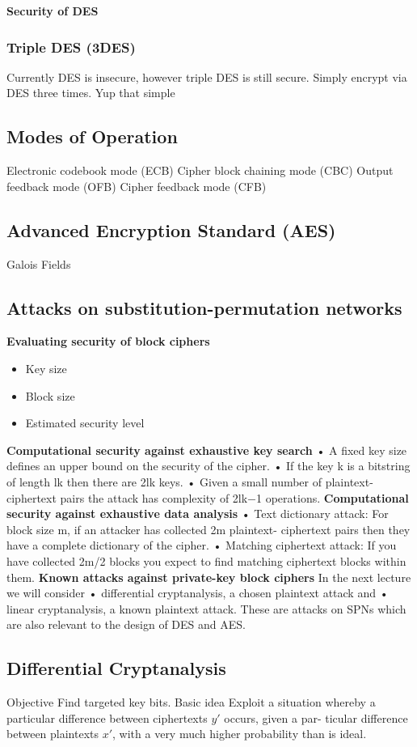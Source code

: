 \textbf{Security of DES}

\subsubsection{Triple DES (3DES)}
Currently DES is insecure, however triple DES is still secure.
Simply encrypt via DES three times. Yup that simple

\subsection{Modes of Operation}
Electronic codebook mode (ECB)
Cipher block chaining mode (CBC)
Output feedback mode (OFB)
Cipher feedback mode (CFB)

\subsection{Advanced Encryption Standard (AES)}
Galois Fields

\subsection{Attacks on substitution-permutation networks}
\textbf{Evaluating security of block ciphers}
\begin{itemize}
    \item Key size
    \item Block size
    \item Estimated security level
\end{itemize}
\textbf{Computational security against exhaustive key search}
• A fixed key size defines an upper bound on the security of the cipher.
• If the key k is a bitstring of length lk then there are 2lk keys.
• Given a small number of plaintext-ciphertext pairs the attack has complexity of 2lk−1 operations.
\textbf{Computational security against exhaustive data analysis}
• Text dictionary attack: For block size m, if an attacker has collected 2m plaintext-
ciphertext pairs then they have a complete dictionary of the cipher.
• Matching ciphertext attack: If you have collected 2m/2 blocks you expect to find matching ciphertext blocks within them.
\textbf{Known attacks against private-key block ciphers}
In the next lecture we will consider
• differential cryptanalysis, a chosen plaintext attack and
• linear cryptanalysis, a known plaintext attack.
These are attacks on SPNs which are also relevant to the design of DES and AES.

\subsection{Differential Cryptanalysis}
Objective
Find targeted key bits.
Basic idea
Exploit a situation whereby a particular difference between ciphertexts $y\prime$ occurs, given a par- ticular difference between plaintexts $x\prime$, with a very much higher probability than is ideal.
